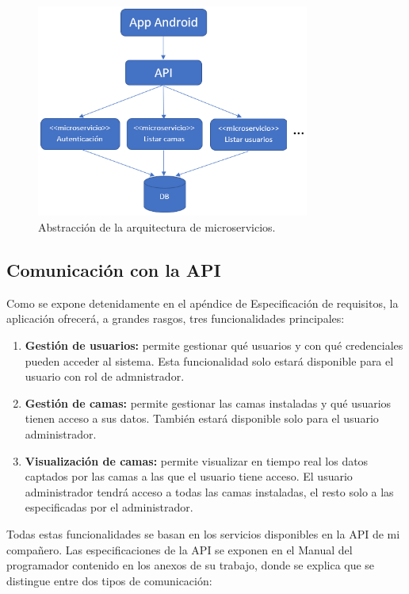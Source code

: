 \begin{figure}[H]
	\centering
	\includegraphics[width=0.8\textwidth]{../img/microservicios.png}
	\caption{Abstracción de la arquitectura de microservicios.}
	\label{fig:microservicios}
\end{figure}

\subsection{Comunicación con la API}

Como se expone detenidamente en el apéndice de Especificación de requisitos, la aplicación ofrecerá, a grandes rasgos, tres funcionalidades principales: 

\begin{enumerate}
	\item \textbf{Gestión de usuarios:} permite gestionar qué usuarios y con qué credenciales pueden acceder al sistema. Esta funcionalidad solo estará disponible para el usuario con rol de admnistrador. 
	\item \textbf{Gestión de camas:} permite gestionar las camas instaladas y qué usuarios tienen acceso a sus datos. También estará disponible solo para el usuario administrador. 
	\item \textbf{Visualización de camas:} permite visualizar en tiempo real los datos captados por las camas a las que el usuario tiene acceso. El usuario administrador tendrá acceso a todas las camas instaladas, el resto solo a las especificadas por el administrador. 
\end{enumerate}

Todas estas funcionalidades se basan en los servicios disponibles en la API de mi compañero. Las especificaciones de la API se exponen en el Manual del programador contenido en los anexos de su trabajo, donde se explica que se distingue entre dos tipos de comunicación: 

